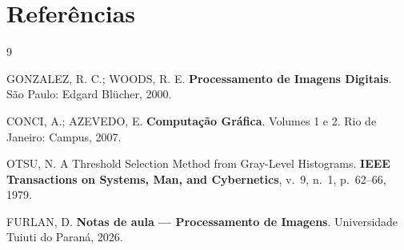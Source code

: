 \documentclass[12pt,a4paper]{article}
\begin{document}
\section*{Referências}

\begin{thebibliography}{9}

GONZALEZ, R. C.; WOODS, R. E.
\textbf{Processamento de Imagens Digitais}.
São Paulo: Edgard Blücher, 2000.

CONCI, A.; AZEVEDO, E.
\textbf{Computação Gráfica}. Volumes 1 e 2.
Rio de Janeiro: Campus, 2007.

OTSU, N.
A Threshold Selection Method from Gray-Level Histograms.
\textbf{IEEE Transactions on Systems, Man, and Cybernetics},
v.~9, n.~1, p.~62--66, 1979.

FURLAN, D.
\textbf{Notas de aula --- Processamento de Imagens}.
Universidade Tuiuti do Paraná, 2026.

\end{thebibliography}
\end{document}
